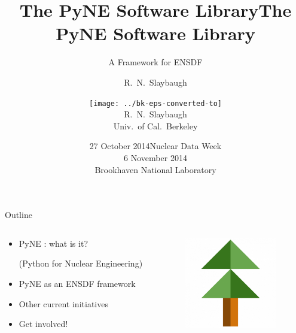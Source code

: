 \documentclass[xcolor=x11names,compress]{beamer}
\title{The PyNE Software Library}
\author{R.\ N.\ Slaybaugh}
\date{27 October 2014}
\renewcommand{\(}{\begin{columns}}
\renewcommand{\)}{\end{columns}}
\newcommand{\<}[1]{\begin{column}{#1}}
\renewcommand{\>}{\end{column}}
\begin{document}
\begin{frame}
\title{The PyNE Software Library}
\subtitle{A Framework for ENSDF}
\author{
\texttt{[image: ../bk-eps-converted-to]}\\R.\ N.\ Slaybaugh \\ Univ.\ of Cal.\ Berkeley}

\date{Nuclear Data Week\\ 6 November 2014\\ Brookhaven National Laboratory}
\titlepage
\end{frame}

\begin{frame}{Outline}

	\begin{columns}
  	\begin{column}{0.5\textwidth}
	    \begin{itemize}
          \item PyNE \cite{pyne}: what is it?
        
          (Python for Nuclear Engineering)
          \item PyNE as an ENSDF framework
          \item Other current initiatives
          \item Get involved!
	    \end{itemize}
  	\end{column}
 	\begin{column}{0.4\textwidth}
 	   \begin{center}
 	   \begin{figure}
       \includegraphics[height=4cm]{../figs/pyne-icon-big}
	   \end{figure}
 	   \end{center}
  	\end{column}
	\end{columns}

\end{frame}
\end{document}
